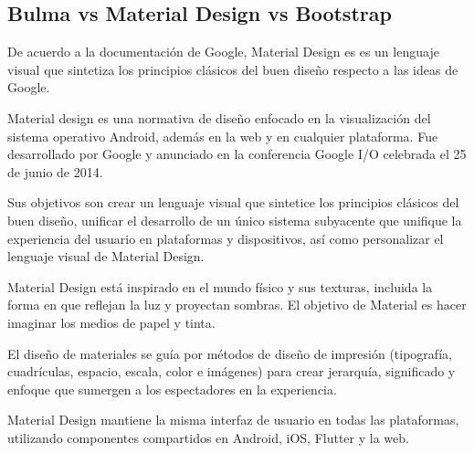 \subsection{Bulma vs Material Design vs Bootstrap}
De acuerdo a la documentación de Google\cite{noauthor_introduction_nodate}, Material Design es es un lenguaje visual que sintetiza los principios clásicos del buen diseño respecto a las ideas de Google.

Material design es una normativa de diseño enfocado en la visualización del sistema operativo Android, además en la web y en cualquier plataforma. Fue desarrollado por Google y anunciado en la conferencia Google I/O celebrada el 25 de junio de 2014. 


Sus objetivos son crear un lenguaje visual que sintetice los principios clásicos del buen diseño, unificar el desarrollo de un único sistema subyacente que unifique la experiencia del usuario en plataformas y dispositivos, así como personalizar el lenguaje visual de Material Design.


Material Design está inspirado en el mundo físico y sus texturas, incluida la forma en que reflejan la luz y proyectan sombras. El objetivo de Material es hacer imaginar los medios de papel y tinta.


El diseño de materiales se guía por métodos de diseño de impresión (tipografía, cuadrículas, espacio, escala, color e imágenes) para crear jerarquía, significado y enfoque que sumergen a los espectadores en la experiencia.


Material Design mantiene la misma interfaz de usuario en todas las plataformas, utilizando componentes compartidos en Android, iOS, Flutter y la web.

